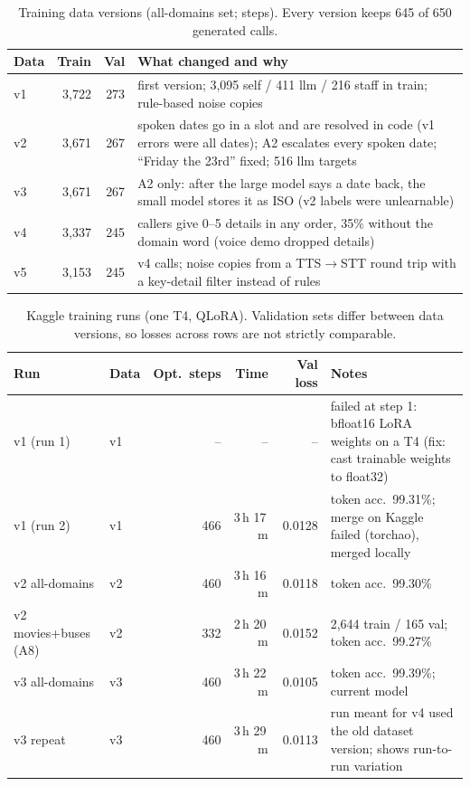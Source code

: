 \documentclass[11pt,a4paper]{article}
\begin{document}
\begin{table}[tbp]
\centering\small
\begin{tabularx}{\linewidth}{@{}l r r L@{}}
\toprule
Data & Train & Val & What changed and why \\
\midrule
v1 & 3,722 & 273 & first version; 3,095 self / 411 llm / 216 staff in train; rule-based noise copies \\
v2 & 3,671 & 267 & spoken dates go in a slot and are resolved in code (v1 errors were all dates); A2 escalates every spoken date; ``Friday the 23rd'' fixed; 516 llm targets \\
v3 & 3,671 & 267 & A2 only: after the large model says a date back, the small model stores it as ISO (v2 labels were unlearnable) \\
v4 & 3,337 & 245 & callers give 0--5 details in any order, 35\% without the domain word (voice demo dropped details) \\
v5 & 3,153 & 245 & v4 calls; noise copies from a TTS$\rightarrow$STT round trip with a key-detail filter instead of rules \\
\bottomrule
\end{tabularx}
\caption{Training data versions (all-domains set; steps). Every version keeps 645 of 650 generated calls.}
\label{tab:data}
\end{table}

\begin{table}[tbp]
\centering\small
\begin{tabularx}{\linewidth}{@{}l l r r r L@{}}
\toprule
Run & Data & Opt.\ steps & Time & Val loss & Notes \\
\midrule
v1 (run 1) & v1 & -- & -- & -- & failed at step 1: bfloat16 LoRA weights on a T4 (fix: cast trainable weights to float32) \\
v1 (run 2) & v1 & 466 & 3\,h 17\,m & 0.0128 & token acc.\ 99.31\%; merge on Kaggle failed (torchao), merged locally \\
v2 all-domains & v2 & 460 & 3\,h 16\,m & 0.0118 & token acc.\ 99.30\% \\
v2 movies+buses (A8) & v2 & 332 & 2\,h 20\,m & 0.0152 & 2,644 train / 165 val; token acc.\ 99.27\% \\
v3 all-domains & v3 & 460 & 3\,h 22\,m & 0.0105 & token acc.\ 99.39\%; current model \\
v3 repeat & v3 & 460 & 3\,h 29\,m & 0.0113 & run meant for v4 used the old dataset version; shows run-to-run variation \\
\bottomrule
\end{tabularx}
\caption{Kaggle training runs (one T4, QLoRA). Validation sets differ between data versions, so losses across rows
are not strictly comparable.}
\label{tab:runs}
\end{table}
\end{document}
